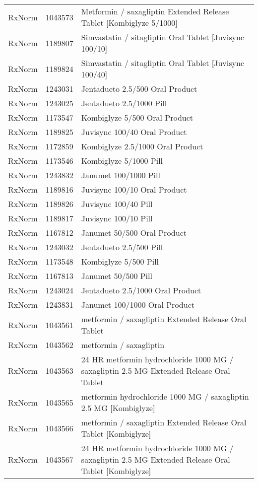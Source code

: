 \begin{longtable}{p{}p{}p{}}
  RxNorm & 1043573 & Metformin / saxagliptin Extended Release Tablet [Kombiglyze 5/1000] \\ 
  RxNorm & 1189807 & Simvastatin / sitagliptin Oral Tablet [Juvisync 100/10] \\ 
  RxNorm & 1189824 & Simvastatin / sitagliptin Oral Tablet [Juvisync 100/40] \\ 
  RxNorm & 1243031 & Jentadueto 2.5/500 Oral Product \\ 
  RxNorm & 1243025 & Jentadueto 2.5/1000 Pill \\ 
  RxNorm & 1173547 & Kombiglyze 5/500 Oral Product \\ 
  RxNorm & 1189825 & Juvisync 100/40 Oral Product \\ 
  RxNorm & 1172859 & Kombiglyze 2.5/1000 Oral Product \\ 
  RxNorm & 1173546 & Kombiglyze 5/1000 Pill \\ 
  RxNorm & 1243832 & Janumet 100/1000 Pill \\ 
  RxNorm & 1189816 & Juvisync 100/10 Oral Product \\ 
  RxNorm & 1189826 & Juvisync 100/40 Pill \\ 
  RxNorm & 1189817 & Juvisync 100/10 Pill \\ 
  RxNorm & 1167812 & Janumet 50/500 Oral Product \\ 
  RxNorm & 1243032 & Jentadueto 2.5/500 Pill \\ 
  RxNorm & 1173548 & Kombiglyze 5/500 Pill \\ 
  RxNorm & 1167813 & Janumet 50/500 Pill \\ 
  RxNorm & 1243024 & Jentadueto 2.5/1000 Oral Product \\ 
  RxNorm & 1243831 & Janumet 100/1000 Oral Product \\ 
  RxNorm & 1043561 & metformin / saxagliptin Extended Release Oral Tablet \\ 
  RxNorm & 1043562 & metformin / saxagliptin \\ 
  RxNorm & 1043563 & 24 HR metformin hydrochloride 1000 MG / saxagliptin 2.5 MG Extended Release Oral Tablet \\ 
  RxNorm & 1043565 & metformin hydrochloride 1000 MG / saxagliptin 2.5 MG [Kombiglyze] \\ 
  RxNorm & 1043566 & metformin / saxagliptin Extended Release Oral Tablet [Kombiglyze] \\ 
  RxNorm & 1043567 & 24 HR metformin hydrochloride 1000 MG / saxagliptin 2.5 MG Extended Release Oral Tablet [Kombiglyze] \\ 

\end{longtable}
